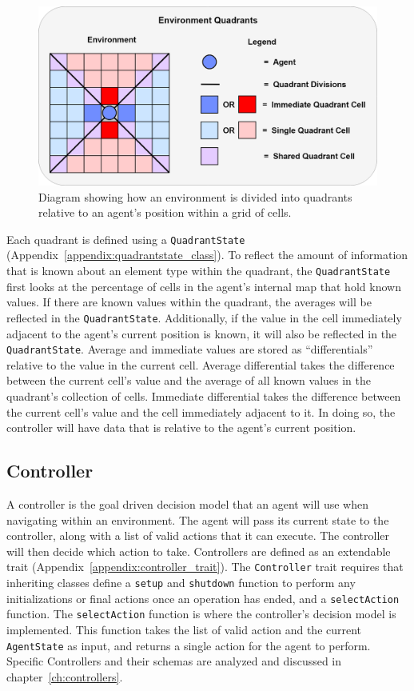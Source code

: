 \begin{figure}[!htb]
  \centering
  \includegraphics[width=1.0\columnwidth]{Figures/quadrants.png}
  \caption{Diagram showing how an environment is divided into quadrants relative to an agent's position within a grid of cells.}
  \label{fig:quadrants}
\end{figure}

Each quadrant is defined using a \texttt{QuadrantState} (Appendix~\ref{appendix:quadrantstate_class}).
To reflect the amount of information that is known about an element type within the quadrant, the \texttt{QuadrantState} first looks at the percentage of cells in the agent's internal map that hold known values.
If there are known values within the quadrant, the averages will be reflected in the \texttt{QuadrantState}.
Additionally, if the value in the cell immediately adjacent to the agent's current position is known, it will also be reflected in the \texttt{QuadrantState}.
Average and immediate values are stored as ``differentials'' relative to the value in the current cell.
Average differential takes the difference between the current cell's value and the average of all known values in the quadrant's collection of cells.
Immediate differential takes the difference between the current cell's value and the cell immediately adjacent to it.
In doing so, the controller will have data that is relative to the agent's current position.


\subsection{Controller} \label{subsec:controller}
A controller is the goal driven decision model that an agent will use when navigating within an environment.
The agent will pass its current state to the controller, along with a list of valid actions that it can execute.
The controller will then decide which action to take.
Controllers are defined as an extendable trait (Appendix~\ref{appendix:controller_trait}).
The \texttt{Controller} trait requires that inheriting classes define a \texttt{setup} and \texttt{shutdown} function to perform any initializations or final actions once an operation has ended, and a \texttt{selectAction} function.
The \texttt{selectAction} function is where the controller's decision model is implemented.
This function takes the list of valid action and the current \texttt{AgentState} as input, and returns a single action for the agent to perform.
Specific Controllers and their schemas are analyzed and discussed in chapter~\ref{ch:controllers}.




